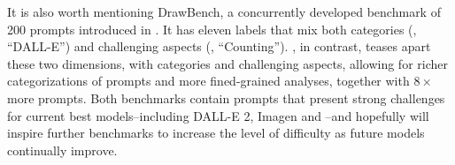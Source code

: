 It is also worth mentioning DrawBench, a concurrently developed benchmark of 200 prompts introduced in \cite{imagen}. It has eleven labels that mix both categories (\eg, ``DALL-E'') and challenging aspects (\eg, ``Counting''). \bcp{}, in contrast, teases apart these two dimensions, with \bcpcat{} categories and \bcptrick{} challenging aspects, allowing for richer categorizations of prompts and more fined-grained analyses, together with \(8\times\) more prompts. Both benchmarks contain prompts that present strong challenges for current best models--including DALL-E 2, Imagen and \bdraw--and hopefully will inspire further benchmarks to increase the level of difficulty as future models continually improve.
